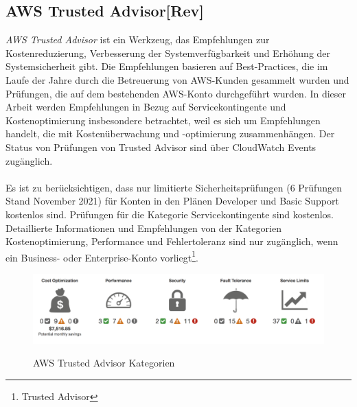 \subsection{AWS Trusted Advisor[Rev]}
\textit{AWS Trusted Advisor} ist ein Werkzeug, das Empfehlungen zur Kostenreduzierung, Verbesserung der Systemverfügbarkeit und Erhöhung der Systemsicherheit gibt. Die Empfehlungen basieren auf Best-Practices, die im Laufe der Jahre durch die Betreuerung von AWS-Kunden gesammelt wurden und Prüfungen, die auf dem bestehenden AWS-Konto durchgeführt wurden.
In dieser Arbeit werden Empfehlungen in Bezug auf Servicekontingente und Kostenoptimierung insbesondere betrachtet, weil es sich um Empfehlungen handelt, die mit Kostenüberwachung und -optimierung zusammenhängen. Der Status von Prüfungen von Trusted Advisor sind über CloudWatch Events zugänglich. 
\\\\
Es ist zu berücksichtigen, dass nur limitierte Sicherheitsprüfungen (6 Prüfungen Stand November 2021) für Konten in den Plänen Developer und Basic Support kostenlos sind. Prüfungen für die Kategorie Servicekontingente sind kostenlos. Detaillierte Informationen und Empfehlungen von der Kategorien Kostenoptimierung, Performance und Fehlertoleranz sind nur zugänglich, wenn ein Business- oder Enterprise-Konto vorliegt\footnote{Trusted Advisor\cite{AMZ20}}. 
\\
\begin{figure}[h!]
      \centering
      \includegraphics[scale=0.4]{sources/AWS_Trusted_Advisor_Kategorien}
      \caption[AWS Trusted Advisor Kategorien]{}
      \label{fig:AWS_Trusted_Advisor_Kategorien} 
      AWS Trusted Advisor Kategorien\cite{AMZ20}
\end{figure}
